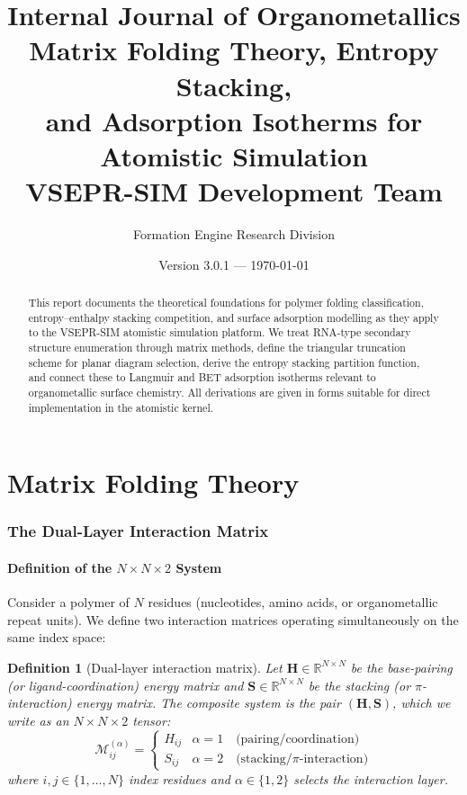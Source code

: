 \documentclass[11pt]{article}
\title{\textbf{Internal Journal of Organometallics} \\[6pt]
\Large Matrix Folding Theory, Entropy Stacking, \\
and Adsorption Isotherms for Atomistic Simulation \\[6pt]
\large VSEPR-SIM Development Team}
\author{Formation Engine Research Division}
\date{Version 3.0.1 — \today}
\newtheorem{definition}{Definition}[section]
\begin{document}
\maketitle
\thispagestyle{fancy}

\begin{abstract}
This report documents the theoretical foundations for polymer folding
classification, entropy--enthalpy stacking competition, and surface
adsorption modelling as they apply to the VSEPR-SIM atomistic simulation
platform.  We treat RNA-type secondary structure enumeration through
matrix methods, define the triangular truncation scheme for planar
diagram selection, derive the entropy stacking partition function, and
connect these to Langmuir and BET adsorption isotherms relevant to
organometallic surface chemistry.  All derivations are given in forms
suitable for direct implementation in the atomistic kernel.
\end{abstract}

\tableofcontents
\newpage


\part{Matrix Folding Theory}

\section{The Dual-Layer Interaction Matrix}

\subsection{Definition of the $N \times N \times 2$ System}

Consider a polymer of $N$ residues (nucleotides, amino acids, or
organometallic repeat units).  We define two interaction matrices
operating simultaneously on the same index space:

\begin{definition}[Dual-layer interaction matrix]
Let $\mathbf{H} \in \mathbb{R}^{N \times N}$ be the \emph{base-pairing}
(or ligand-coordination) energy matrix and
$\mathbf{S} \in \mathbb{R}^{N \times N}$ be the \emph{stacking}
(or $\pi$-interaction) energy matrix.  The composite system is the pair
$(\mathbf{H}, \mathbf{S})$, which we write as an
$N \times N \times 2$ tensor:
\begin{equation}
  \mathcal{M}_{ij}^{(\alpha)} =
  \begin{cases}
    H_{ij} & \alpha = 1 \quad \text{(pairing/coordination)} \\
    S_{ij} & \alpha = 2 \quad \text{(stacking/$\pi$-interaction)}
  \end{cases}
\end{equation}
where $i,j \in \{1, \ldots, N\}$ index residues and $\alpha \in \{1,2\}$
selects the interaction layer.
\end{definition}
\end{document}

